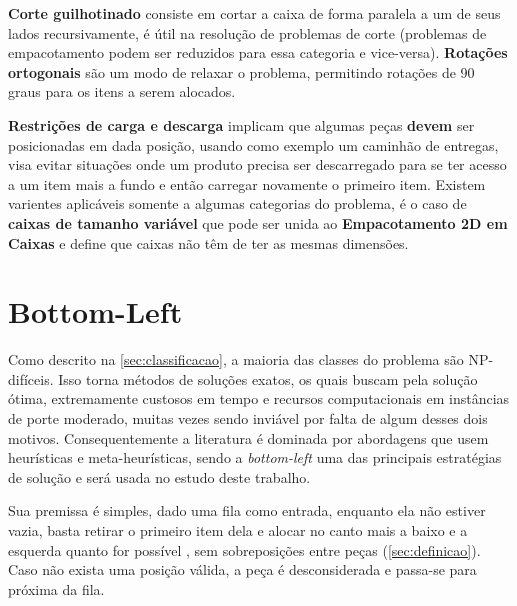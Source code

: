 \textbf{Corte guilhotinado} consiste em cortar a caixa de forma paralela a um de seus lados recursivamente, é útil na resolução de problemas de corte (problemas de empacotamento podem ser reduzidos para essa categoria e vice-versa).
\textbf{Rotações ortogonais} são um modo de relaxar o problema, permitindo rotações de 90 graus para os itens a serem alocados.

\textbf{Restrições de carga e descarga} implicam que algumas peças \textbf{devem} ser posicionadas em dada posição, usando como exemplo um caminhão de entregas, visa evitar situações onde um produto precisa ser descarregado para se ter acesso a um item mais a fundo e então carregar novamente o primeiro item.
Existem varientes aplicáveis somente a algumas categorias do problema, é o caso de \textbf{caixas de tamanho variável}  que pode ser unida ao \textbf{Empacotamento 2D em Caixas} e define que caixas não têm de ter as mesmas dimensões.


\section{Bottom-Left}\label{sec:bottom-left}

Como descrito na \autoref{sec:classificacao}, a maioria das classes do problema são NP-difíceis.
Isso torna métodos de soluções exatos, os quais buscam pela solução ótima, extremamente custosos em tempo e recursos computacionais em instâncias de porte moderado, muitas vezes sendo inviável por falta de algum desses dois motivos.
Consequentemente a literatura é dominada por abordagens que usem heurísticas e meta-heurísticas, sendo a \textit{bottom-left} uma das principais estratégias de solução e será usada no estudo deste trabalho.

Sua premissa é simples, dado uma fila como entrada, enquanto ela não estiver vazia, basta retirar o primeiro item dela e alocar no canto mais a baixo e a esquerda quanto for possível \cite{aprendizado-reforco}, sem sobreposições entre peças (\autoref{sec:definicao}).
Caso não exista uma posição válida, a peça é desconsiderada e passa-se para próxima da fila.

